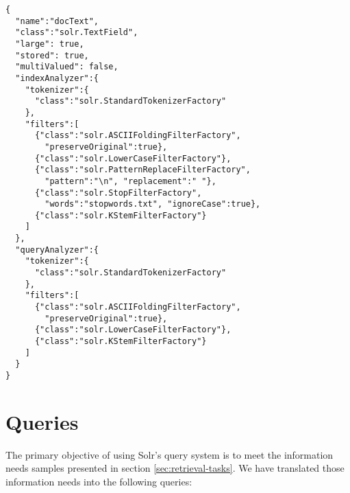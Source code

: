 \documentclass[sigconf, authorversion]{acmart}
\begin{document}
\begin{lstlisting}
{
  "name":"docText",
  "class":"solr.TextField",
  "large": true,
  "stored": true,
  "multiValued": false,
  "indexAnalyzer":{
    "tokenizer":{
      "class":"solr.StandardTokenizerFactory"
    },
    "filters":[
      {"class":"solr.ASCIIFoldingFilterFactory",
        "preserveOriginal":true},
      {"class":"solr.LowerCaseFilterFactory"},
      {"class":"solr.PatternReplaceFilterFactory",
        "pattern":"\n", "replacement":" "},
      {"class":"solr.StopFilterFactory",
        "words":"stopwords.txt", "ignoreCase":true},
      {"class":"solr.KStemFilterFactory"}
    ]
  },
  "queryAnalyzer":{
    "tokenizer":{
      "class":"solr.StandardTokenizerFactory"
    },
    "filters":[
      {"class":"solr.ASCIIFoldingFilterFactory",
        "preserveOriginal":true},
      {"class":"solr.LowerCaseFilterFactory"},
      {"class":"solr.KStemFilterFactory"}
    ]
  }
}
\end{lstlisting}

\section{Queries}

The primary objective of using Solr's query system is to meet the information needs samples presented in section \ref{sec:retrieval-tasks}. We have translated those information needs into the following queries:
\end{document}
